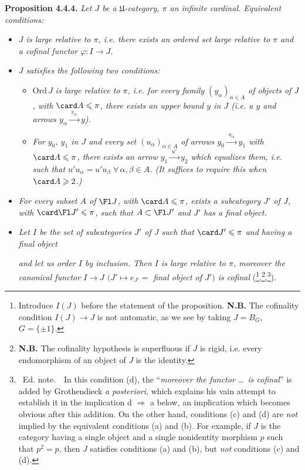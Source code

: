 \textbf{Proposition 4.4.4.} \textit{Let $J$ be a $\mathfrak{U}$-category, $\pi$ an infinite cardinal. Equivalent conditions:}
\begin{itemize}[leftmargin=4em]
\item[\textit{a)}] \textit{$J$ is large relative to $\pi$, i.e. there exists an ordered set large relative to $\pi$ and a cofinal functor $\varphi : I \longrightarrow J$.}
\item[\textit{b)}] \textit{$J$ satisfies the following two conditions:}
\begin{itemize}[leftmargin=4em]
\item[$\mathrm{PF}_{\pi}\,1$] $\mathrm{Ord}\,J$ \textit{is large relative to $\pi$, i.e. for every family $(y_\alpha)_{\alpha\in A}$ of objects of $J$, with} $\card A \leqslant \pi$\textit{, there exists an upper bound $y$ in $J$ (i.e. a $y$ and arrows $y_\alpha \xrightarrow{\;v_\alpha\;} y$).}
\item[$\mathrm{PF}_{\pi}\,2$] \textit{For $y_0$, $y_1$ in $J$ and every set $(u_\alpha)_{\alpha\in A}$ of arrows $y_0 \xrightarrow{\;u_\alpha\;} y_1$ with} $\card A \leqslant \pi$\textit{, there exists an arrow $y_1 \xrightarrow{\;u'\;} y_2$ which equalizes them, i.e. such that $u'u_\alpha = u'u_\beta \;\forall\, \alpha,\beta \in A$. (It suffices to require this when} $\card A \geqslant 2$.\textit{)}
\end{itemize}
\item[\textit{c)}] \textit{For every subset $A$ of} $\Fl J$\textit{, with} $\card A \leqslant \pi$\textit{, exists a subcategory $J'$ of $J$, with} $\card\Fl J' \leqslant \pi$\textit{, such that $A \subset \Fl J'$ and $J'$ has a final object.}
\item[\textit{d)}] \textit{Let $I$ be the set of subcategories $J'$ of $J$ such that} $\card J' \leqslant \pi$ \textit{and having a final object}

\textit{and let us order $I$ by inclusion. Then $I$ is large relative to $\pi$, moreover the canonical functor $I \longrightarrow J$ $(J' \longmapsto e_{J'} =$ final object of $J')$ is cofinal} (\footnote{Introduce $I(J)$ before the statement of the proposition. \textbf{N.B.} The cofinality condition $I(J) \longrightarrow J$ is not automatic, as we see by taking $J = B_G$, $G = \{\pm 1\}$.},\footnote{\textbf{N.B.} The cofinality hypothesis is superfluous if $J$ is rigid, i.e. every endomorphism of an object of $J$ is the identity.},\footnote{\ Ed. note.\ \ In this condition (d), the ``\textit{moreover the functor \dots\ is cofinal}'' is added by Grothendieck \textit{a posteriori}, which explains his vain attempt to establish it in the implication d $\Longrightarrow$ a below, an implication which becomes obvious after this addition. On the other hand, conditions (c) and (d) are \textit{not} implied by the equivalent conditions (a) and (b). For example, if $J$ is the category having a single object and a single nonidentity morphism $p$ such that $p^2 = p$, then $J$ satisfies conditions (a) and (b), but \textit{not} conditions (c) and (d).}).
\end{itemize}
